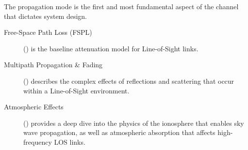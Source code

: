 \begin{importantbox}[title={Further Reading}]
    The propagation mode is the first and most fundamental aspect of the channel that dictates system design.
    \begin{description}
        \item[Free-Space Path Loss (FSPL)] () is the baseline attenuation model for Line-of-Sight links.
        \item[Multipath Propagation \& Fading] () describes the complex effects of reflections and scattering that occur within a Line-of-Sight environment.
        \item[Atmospheric Effects] () provides a deep dive into the physics of the ionosphere that enables sky wave propagation, as well as atmospheric absorption that affects high-frequency LOS links.
    \end{description}
\end{importantbox}
